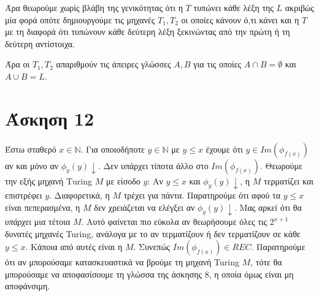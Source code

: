 \documentclass[a4paper, oneside, 11pt]{article}
\theoremstyle{definition}
\begin{document}
Άρα θεωρούμε χωρίς βλάβη της γενικότητας ότι η $T$ τυπώνει κάθε λέξη της $L$ ακριβώς
μία φορά οπότε δημιουργούμε τις μηχανές $T_1, T_2$ οι οποίες κάνουν ό,τι κάνει και η
$T$ με τη διαφορά ότι τυπώνουν κάθε δεύτερη λέξη ξεκινώντας από την πρώτη ή τη
δεύτερη αντίστοιχα.

Άρα οι $T_1, T_2$ απαριθμούν τις άπειρες γλώσσες $A, B$ για τις οποίες $A \cap B =
\emptyset$ και $A \cup B = L$.

\section*{Άσκηση 12}

Έστω σταθερό $x\in \mathbb{N}$. Για οποιοδήποτε $y\in \mathbb{N}$ με $y\leq x$ έχουμε
ότι $y\in Im(\phi_{f(x)})$ αν και μόνο αν $\phi_y(y)\downarrow$. Δεν υπάρχει τίποτα 
άλλο στο $Im(\phi_{f(x)})$. Θεωρούμε την εξής μηχανή Τuring $M$ με είσοδο $y$:
Αν $y\leq x$ και $\phi_y(y)\downarrow$, η $M$ τερματίζει και επιστρέφει $y$. 
Διαφορετικά, η $M$ τρέχει για πάντα. 
Παρατηρούμε ότι αφού τα $y\leq x$ είναι πεπερασμένα, η $M$ δεν χρειάζεται να ελέγξει
αν $\phi_y(y)\downarrow$. Μας αρκεί ότι θα \textit{υπάρχει} μια τέτοια $M$. Αυτό φαίνεται
πιο εύκολα αν θεωρήσουμε όλες τις $2^{x+1}$ δυνατές μηχανές Turing, ανάλογα με το αν 
τερματίζουν ή δεν τερματίζουν σε κάθε $y\leq x$. Kάποια από αυτές είναι η $M$.
Συνεπώς $Im(\phi_{f(x)})\in REC$. Παρατηρούμε ότι αν μπορούσαμε κατασκευαστικά να βρούμε τη μηχανή Turing $M$, τότε θα μπορούσαμε να αποφασίσουμε τη γλώσσα της άσκησης 8, η οποία όμως είναι μη αποφάνσιμη.

\end{document}
